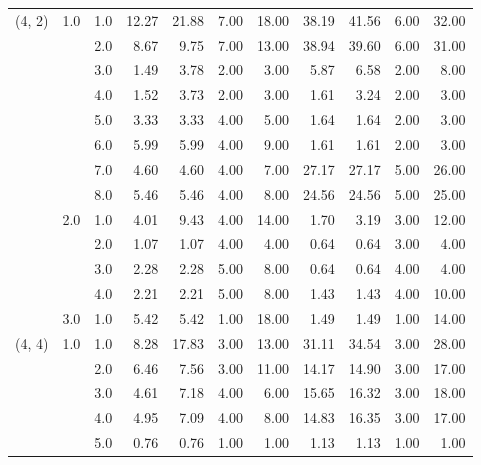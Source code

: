 \begin{tabular}{lllrrrrrrrr}
(4, 2) & 1.0 & 1.0  &      12.27 &     21.88 &  7.00 &  18.00 &      38.19 &     41.56 & 6.00 &  32.00 \\
       &     & 2.0  &       8.67 &      9.75 &  7.00 &  13.00 &      38.94 &     39.60 & 6.00 &  31.00 \\
       &     & 3.0  &       1.49 &      3.78 &  2.00 &   3.00 &       5.87 &      6.58 & 2.00 &   8.00 \\
       &     & 4.0  &       1.52 &      3.73 &  2.00 &   3.00 &       1.61 &      3.24 & 2.00 &   3.00 \\
       &     & 5.0  &       3.33 &      3.33 &  4.00 &   5.00 &       1.64 &      1.64 & 2.00 &   3.00 \\
       &     & 6.0  &       5.99 &      5.99 &  4.00 &   9.00 &       1.61 &      1.61 & 2.00 &   3.00 \\
       &     & 7.0  &       4.60 &      4.60 &  4.00 &   7.00 &      27.17 &     27.17 & 5.00 &  26.00 \\
       &     & 8.0  &       5.46 &      5.46 &  4.00 &   8.00 &      24.56 &     24.56 & 5.00 &  25.00 \\
       & 2.0 & 1.0  &       4.01 &      9.43 &  4.00 &  14.00 &       1.70 &      3.19 & 3.00 &  12.00 \\
       &     & 2.0  &       1.07 &      1.07 &  4.00 &   4.00 &       0.64 &      0.64 & 3.00 &   4.00 \\
       &     & 3.0  &       2.28 &      2.28 &  5.00 &   8.00 &       0.64 &      0.64 & 4.00 &   4.00 \\
       &     & 4.0  &       2.21 &      2.21 &  5.00 &   8.00 &       1.43 &      1.43 & 4.00 &  10.00 \\
       & 3.0 & 1.0  &       5.42 &      5.42 &  1.00 &  18.00 &       1.49 &      1.49 & 1.00 &  14.00 \\
(4, 4) & 1.0 & 1.0  &       8.28 &     17.83 &  3.00 &  13.00 &      31.11 &     34.54 & 3.00 &  28.00 \\
       &     & 2.0  &       6.46 &      7.56 &  3.00 &  11.00 &      14.17 &     14.90 & 3.00 &  17.00 \\
       &     & 3.0  &       4.61 &      7.18 &  4.00 &   6.00 &      15.65 &     16.32 & 3.00 &  18.00 \\
       &     & 4.0  &       4.95 &      7.09 &  4.00 &   8.00 &      14.83 &     16.35 & 3.00 &  17.00 \\
       &     & 5.0  &       0.76 &      0.76 &  1.00 &   1.00 &       1.13 &      1.13 & 1.00 &   1.00 \\

\end{tabular}
